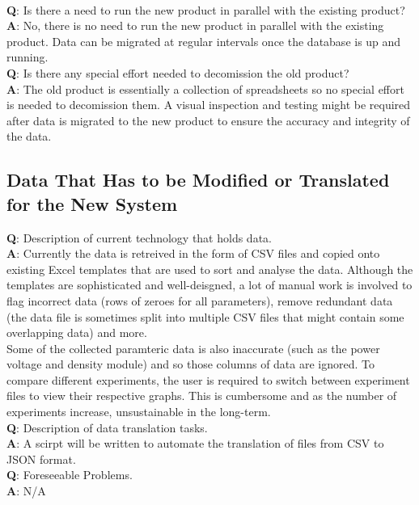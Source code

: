 \documentclass[12pt]{article}
\begin{document}
\ \\
\textbf{Q}: Is there a need to run the new product in parallel with the existing
product?\\
\textbf{A}: No, there is no need to run the new product in parallel with the
existing product. Data can be migrated at regular intervals once the database is
up and running.\\
\newline
\textbf{Q}: Is there any special effort needed to decomission the old product?\\
\textbf{A}: The old product is essentially a collection of spreadsheets so no
special effort is needed to decomission them. A visual inspection and testing
might be required after data is migrated to the new product to ensure the
accuracy and integrity of the data.

\subsection{Data That Has to be Modified or Translated for the New System}
\textbf{Q}: Description of current technology that holds data.\\
\textbf{A}: Currently the data is retreived in the form of CSV files and copied
onto existing Excel templates that are used to sort and analyse the data.
Although the templates are sophisticated and well-deisgned, a lot of manual work
is involved to flag incorrect data (rows of zeroes for all parameters), remove
redundant data (the data file is sometimes split into multiple CSV files that
might contain some overlapping data) and more.\\
\newline
Some of the collected paramteric data is also inaccurate (such as the power
voltage and density module) and so those columns of data are ignored. To compare
different experiments, the user is required to switch between experiment files
to view their respective graphs. This is cumbersome and as the number of
experiments increase, unsustainable in the long-term.\\
\newline
\textbf{Q}: Description of data translation tasks.\\
\textbf{A}: A scirpt will be written to automate the translation of files from
CSV to JSON format.\\
\newline
\textbf{Q}: Foreseeable Problems.\\
\textbf{A}: N/A
\end{document}
